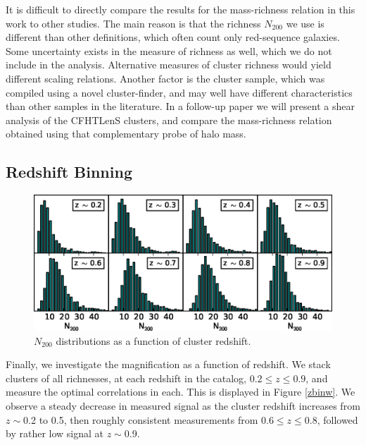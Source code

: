 It is difficult to directly compare the results for the mass-richness relation in this work to other studies. The main reason is that the richness $N_{200}$ we use is different than other definitions, which often count only red-sequence galaxies. Some uncertainty exists in the measure of richness as well, which we do not include in the analysis. Alternative measures of cluster richness would yield different scaling relations. Another factor is the cluster sample, which was compiled using a novel cluster-finder, and may well have different characteristics than other samples in the literature. In a follow-up paper we will present a shear analysis of the CFHTLenS clusters, and compare the mass-richness relation obtained using that complementary probe of halo mass.


\subsection{Redshift Binning}
\label{zbin}

\begin{figure}
\begin{center}
\includegraphics[scale=1.0]{plots_ch3/zbin_histograms.eps}
\caption[Richness Distributions in Redshift Bins]{$N_{200}$ distributions as a function of cluster redshift.}
\label{zbinhist}
\end{center}
\end{figure}

Finally, we investigate the magnification as a function of redshift. We stack clusters of all richnesses, at each redshift in the catalog, $0.2 \leq z \leq 0.9$, and measure the optimal correlations in each. This is displayed in Figure \ref{zbinw}. We observe a steady decrease in measured signal as the cluster redshift increases from $z \sim$0.2 to 0.5, then roughly consistent measurements from 0.6$\leq z \leq$0.8, followed by rather low signal at $z \sim$0.9. 

